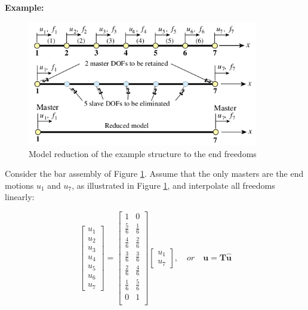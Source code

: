 \documentclass[10pt,b5paper,titlepage]{book}
\begin{document}
\textbf{Example:}

\begin{figure}[ht]
    \centering
    \includegraphics[width=0.90\textwidth]{img/mfc_model_reduction_end.png}
    \caption{Model reduction of the example structure to the end freedoms}
    \label{fig:mfc-model-reduction-end-png}
\end{figure}

Consider the bar assembly of Figure \ref{fig:mfc-model-reduction-end-png}.
Assume that the only masters are the end motions $ u_1 $ and $ u_7 $, as
illustrated in Figure \ref{fig:mfc-model-reduction-end-png}, and interpolate
all freedoms linearly:

\begin{equation}
    \begin{bmatrix}
        u_1 \\
        u_2 \\
        u_3 \\
        u_4 \\
        u_5 \\
        u_6 \\
        u_7
    \end{bmatrix}
    = \begin{bmatrix}
        1 & 0 \\
        \frac{5}{6} & \frac{1}{6} \\
        \frac{4}{6} & \frac{2}{6} \\
        \frac{3}{6} & \frac{3}{6} \\
        \frac{2}{6} & \frac{4}{6} \\
        \frac{1}{6} & \frac{5}{6} \\
        0 & 1 \\
    \end{bmatrix}
    \begin{bmatrix}
        u_1 \\
        u_7
    \end{bmatrix}, \quad or \quad
    \mathbf{u} = \mathbf{T} \mathbf{\hat{u}}
\end{equation}
\end{document}
